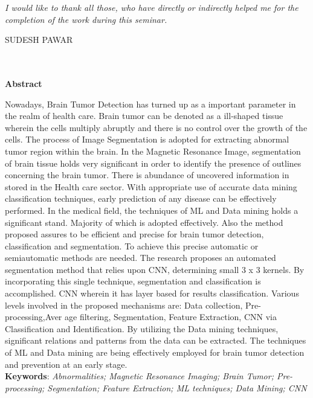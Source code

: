 \documentclass[a4paper, 12pt]{report}
\begin{document}
\begin{frontmatter}
\par \textit{\quad \quad I would like to thank all those, who have directly or indirectly helped me for the completion of the work during this seminar.}
\vspace{0.8in}
\begin{flushright}
{SUDESH PAWAR}\\
\hspace*{0.1in}{T.E. Computer Engineering}\\
\hspace*{0.1in}{Seat no. : 71818502B}\\
\end{flushright}



\newpage
\tableofcontents
\listoffigures
\listoftables
{}
\newpage
\begin{center}
{\Large{\bf Abstract}}
\end{center}

Nowadays, Brain Tumor Detection has turned up as a important parameter in the realm of health care. Brain tumor can be denoted as a ill-shaped tissue wherein the cells multiply abruptly and there is no control over the growth of the cells. The process of Image Segmentation is adopted for extracting abnormal tumor region within the brain. In the Magnetic Resonance Image, segmentation of brain tissue holds very significant in order to identify the presence of outlines concerning the brain tumor. There is abundance of uncovered information in stored in the Health care sector. With appropriate use of accurate data mining classification techniques, early prediction of any disease can be effectively performed. In the medical field, the techniques of ML and Data mining holds a significant stand. Majority of which is adopted effectively. Also the method proposed assures to be efficient and precise for brain tumor detection, classification and segmentation. To achieve this precise automatic or semiautomatic methods are needed. The research proposes an automated segmentation method that relies upon CNN, determining small 3 x 3 kernels. By incorporating this single technique, segmentation and classification is accomplished. CNN wherein it has layer based for results classification. Various levels involved in the proposed mechanisms are: Data collection, Pre-processing,Aver age filtering, Segmentation, Feature Extraction, CNN via Classification and Identification. By utilizing the Data mining techniques, significant relations and patterns from the data can be extracted. The techniques of ML and Data mining are being effectively employed for brain tumor detection and prevention at an early stage.\\
[1cm]
{\textbf{Keywords}}:\textit{ Abnormalities; Magnetic Resonance Imaging; Brain Tumor; Pre-processing; Segmentation; Feature Extraction; ML techniques; Data Mining; CNN}
\vspace{0.3cm}
\end{frontmatter}
\end{document}
